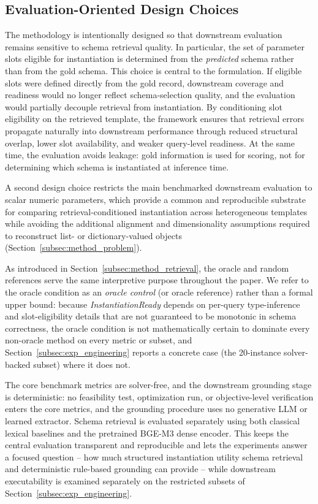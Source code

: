 \documentclass[3p]{elsarticle}
\begin{document}
\subsection{Evaluation-Oriented Design Choices}
\label{subsec:method_design}

The methodology is intentionally designed so that downstream evaluation remains sensitive to schema retrieval quality. In particular, the set of parameter slots eligible for instantiation is determined from the \emph{predicted} schema rather than from the gold schema. This choice is central to the formulation. If eligible slots were defined directly from the gold record, downstream coverage and readiness would no longer reflect schema-selection quality, and the evaluation would partially decouple retrieval from instantiation. By conditioning slot eligibility on the retrieved template, the framework ensures that retrieval errors propagate naturally into downstream performance through reduced structural overlap, lower slot availability, and weaker query-level readiness. At the same time, the evaluation avoids leakage: gold information is used for scoring, not for determining which schema is instantiated at inference time.

A second design choice restricts the main benchmarked downstream evaluation to scalar numeric parameters, which provide a common and reproducible substrate for comparing retrieval-conditioned instantiation across heterogeneous templates while avoiding the additional alignment and dimensionality assumptions required to reconstruct list- or dictionary-valued objects (Section~\ref{subsec:method_problem}).

As introduced in Section~\ref{subsec:method_retrieval}, the oracle and random references serve the same interpretive purpose throughout the paper. We refer to the oracle condition as an \emph{oracle control} (or oracle reference) rather than a formal upper bound: because \textit{InstantiationReady} depends on per-query type-inference and slot-eligibility details that are not guaranteed to be monotonic in schema correctness, the oracle condition is not mathematically certain to dominate every non-oracle method on every metric or subset, and Section~\ref{subsec:exp_engineering} reports a concrete case (the 20-instance solver-backed subset) where it does not.

The core benchmark metrics are solver-free, and the downstream grounding stage is deterministic: no feasibility test, optimization run, or objective-level verification enters the core metrics, and the grounding procedure uses no generative LLM or learned extractor. Schema retrieval is evaluated separately using both classical lexical baselines and the pretrained BGE-M3 dense encoder. This keeps the central evaluation transparent and reproducible and lets the experiments answer a focused question -- how much structured instantiation utility schema retrieval and deterministic rule-based grounding can provide -- while downstream executability is examined separately on the restricted subsets of Section~\ref{subsec:exp_engineering}.
\end{document}
